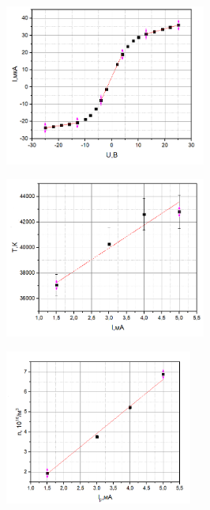 \documentclass[a4paper]{article}
\begin{document}
\begin{figure}[!h]
\centering
\includegraphics[width = 0.59\textwidth]{graph_6.png}
\end{figure}

\begin{figure}[!h]
\centering
\includegraphics[width = 0.59\textwidth]{graph_7.png}
\end{figure}

\begin{figure}[!h]
\centering
\includegraphics[width = 0.55\textwidth]{graph_8.png}
\end{figure}
\end{document}
